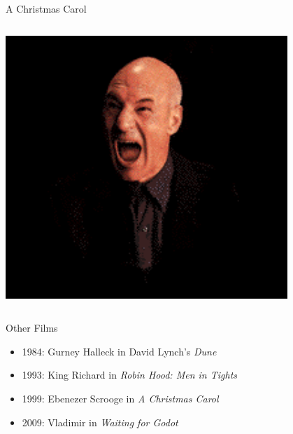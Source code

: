\documentclass[xcolor=dvipsnames]{beamer}
\begin{document}
\begin{frame}{A Christmas Carol}
\begin{columns}
\begin{column}{0.3\textwidth}
      \includegraphics[width=0.8\textwidth]{carol2.png} 
    \end{column}
  \end{columns}

\end{frame}

\begin{frame}{Other Films}
  \begin{itemize}
    \item 1984: Gurney Halleck in David Lynch's \emph{Dune}
    \item 1993: King Richard in \emph{Robin Hood: Men in Tights}
    \item 1999: Ebenezer Scrooge in \emph{A Christmas Carol}
    \item 2009: Vladimir in \emph{Waiting for Godot}
  \end{itemize}
\end{frame}
\end{document}
